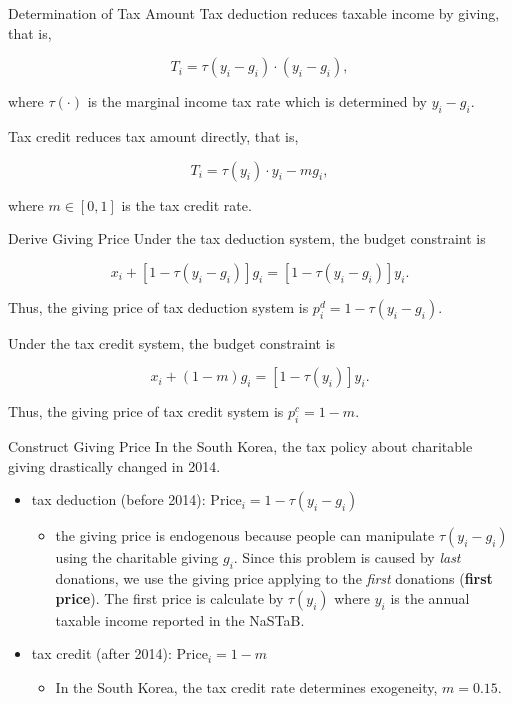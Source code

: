 \documentclass[
  ignorenonframetext,
]{beamer}
\providecommand{\tightlist}{%
  \setlength{\itemsep}{0pt}\setlength{\parskip}{0pt}}
\begin{document}
\begin{frame}{Determination of Tax Amount}
\protect\hypertarget{determination-of-tax-amount}{}
Tax deduction reduces taxable income by giving, that is,

\[
    T_i = \tau(y_i - g_i) \cdot (y_i - g_i),
\]

where \(\tau(\cdot)\) is the marginal income tax rate which is determined by \(y_i - g_i\).

Tax credit reduces tax amount directly, that is,

\[
    T_i = \tau(y_i)\cdot y_i - m g_i,
\]

where \(m \in [0, 1]\) is the tax credit rate.
\end{frame}

\begin{frame}{Derive Giving Price}
\protect\hypertarget{derive-giving-price}{}
Under the tax deduction system, the budget constraint is

\[
    x_i + [1 - \tau(y_i - g_i)]g_i = [1 - \tau(y_i - g_i)] y_i.
\]

Thus, the giving price of tax deduction system is \(p_i^{d} = 1 - \tau(y_i - g_i)\).

Under the tax credit system, the budget constraint is

\[
    x_i + (1 - m) g_i = [1 - \tau(y_i)] y_i.
\]

Thus, the giving price of tax credit system is \(p_i^c = 1 - m\).
\end{frame}

\begin{frame}{Construct Giving Price}
\protect\hypertarget{construct-giving-price}{}
In the South Korea, the tax policy about charitable giving drastically changed in 2014.

\begin{itemize}
\tightlist
\item
  tax deduction (before 2014): \(\text{Price}_i = 1 - \tau(y_i - g_i)\)

  \begin{itemize}
  \tightlist
  \item
    the giving price is endogenous because people can manipulate \(\tau(y_i - g_i)\) using the charitable giving \(g_i\). Since this problem is caused by \emph{last} donations, we use the giving price applying to the \emph{first} donations (\textbf{first price}). The first price is calculate by \(\tau(y_i)\) where \(y_i\) is the annual taxable income reported in the NaSTaB.
  \end{itemize}
\item
  tax credit (after 2014): \(\text{Price}_i = 1 - m\)

  \begin{itemize}
  \tightlist
  \item
    In the South Korea, the tax credit rate determines exogeneity, \(m = 0.15\).
  \end{itemize}
\end{itemize}
\end{frame}
\end{document}

